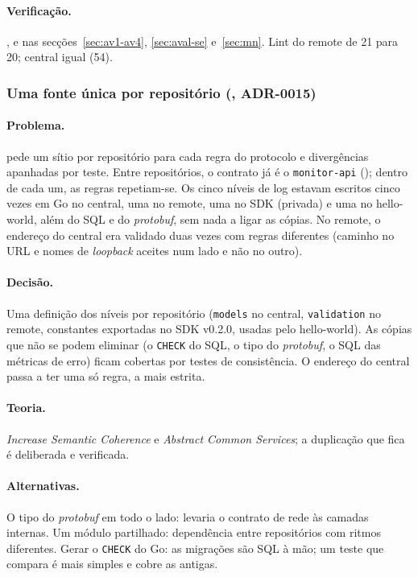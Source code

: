 \paragraph{Verificação.}
,  e  nas secções~\ref{sec:av1-av4}, \ref{sec:aval-se} e~\ref{sec:mn}. Lint do
remote de 21 para 20; central igual (54).

\subsubsection{Uma fonte única por repositório (, ADR-0015)}
\label{sec:d12}

\paragraph{Problema.}
 pede um sítio por repositório para cada regra do protocolo e divergências apanhadas por teste. Entre
repositórios, o contrato já é o \texttt{monitor-api} (); dentro de cada um, as regras repetiam-se. Os cinco
níveis de log estavam escritos cinco vezes em Go no central, uma no remote, uma no SDK (privada) e uma no
hello-world, além do SQL e do \emph{protobuf}, sem nada a ligar as cópias. No remote, o endereço do central era
validado duas vezes com regras diferentes (caminho no URL e nomes de \emph{loopback} aceites num lado e não no
outro).

\paragraph{Decisão.}
Uma definição dos níveis por repositório (\texttt{models} no central, \texttt{validation} no remote, constantes
exportadas no SDK v0.2.0, usadas pelo hello-world). As cópias que não se podem eliminar (o \texttt{CHECK} do SQL, o
tipo do \emph{protobuf}, o SQL das métricas de erro) ficam cobertas por testes de consistência. O endereço do
central passa a ter uma só regra, a mais estrita.

\paragraph{Teoria.}
\emph{Increase Semantic Coherence} e \emph{Abstract Common Services}; a duplicação que fica é deliberada e
verificada.

\paragraph{Alternativas.}
O tipo do \emph{protobuf} em todo o lado: levaria o contrato de rede às camadas internas. Um módulo partilhado:
dependência entre repositórios com ritmos diferentes. Gerar o \texttt{CHECK} do Go: as migrações são SQL à mão;
um teste que compara é mais simples e cobre as antigas.

